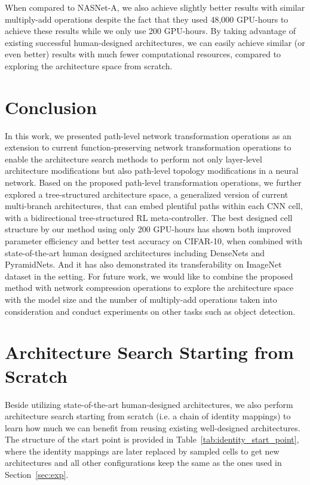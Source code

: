 \documentclass{article}
\begin{document}
When compared to NASNet-A, we also achieve slightly better results with similar multiply-add operations despite the fact that they used 48,000 GPU-hours to achieve these results while we only use 200 GPU-hours. By taking advantage of existing successful human-designed architectures, we can easily achieve similar (or even better) results with much fewer computational resources, compared to exploring the architecture space from scratch. 

\section{Conclusion}
In this work, we presented path-level network transformation operations as an extension to current function-preserving network transformation operations to enable the architecture search methods to perform not only layer-level architecture modifications but also path-level topology modifications in a neural network. Based on the proposed path-level transformation operations, we further explored a tree-structured architecture space, a generalized version of current multi-branch architectures, that can embed plentiful paths within each CNN cell, with a bidirectional tree-structured RL meta-controller. The best designed cell structure by our method using only 200 GPU-hours has shown both improved parameter efficiency and better test accuracy on CIFAR-10, when combined with state-of-the-art human designed architectures including DenseNets and PyramidNets. And it has also demonstrated its transferability on ImageNet dataset in the  setting. For future work, we would like to combine the proposed method with network compression operations to explore the architecture space with the model size and the number of multiply-add operations taken into consideration and conduct experiments on other tasks such as object detection.




\clearpage
\appendix


\section{Architecture Search Starting from Scratch}
Beside utilizing state-of-the-art human-designed architectures, we also perform architecture search starting from scratch (i.e. a chain of identity mappings) to learn how much we can benefit from reusing existing well-designed architectures. The structure of the start point is provided in Table~\ref{tab:identity_start_point}, where the identity mappings are later replaced by sampled cells to get new architectures and all other configurations keep the same as the ones used in Section~\ref{sec:exp}. 
\end{document}
